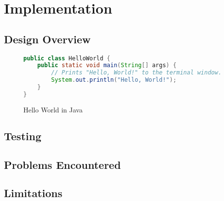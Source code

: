 \chapter{Implementation}
\label{chap:Implementation}

\section{Design Overview}
\label{imp:sec:Design Overview}

\begin{figure}[H]
    \begin{center}
\begin{lstlisting}[language=Java]
public class HelloWorld {
    public static void main(String[] args) {
        // Prints "Hello, World!" to the terminal window.
        System.out.println("Hello, World!");
    }
}
\end{lstlisting}
    \end{center}
    \caption{Hello World in Java}\label{imp:fig:HelloWorldJava}
\end{figure}

\section{Testing}
\label{imp:sec:Testing}

\section{Problems Encountered}
\label{imp:sec:Problems Encountered}

\section{Limitations}
\label{imp:sec:Limitations}

